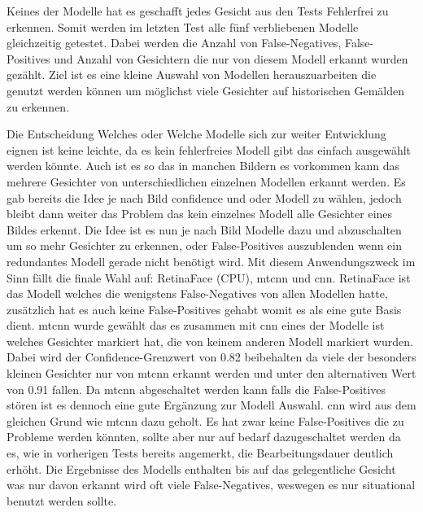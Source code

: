Keines der Modelle hat es geschafft jedes Gesicht aus den Tests Fehlerfrei zu erkennen. Somit werden im letzten Test alle fünf verbliebenen Modelle gleichzeitig getestet. Dabei werden die Anzahl von False-Negatives, False-Positives und Anzahl von Gesichtern die nur von diesem Modell erkannt wurden gezählt. Ziel ist es eine kleine Auswahl von Modellen herauszuarbeiten die genutzt werden können um möglichst viele Gesichter auf historischen Gemälden zu erkennen.

Die Entscheidung Welches oder Welche Modelle sich zur weiter Entwicklung eignen ist keine leichte, da es kein fehlerfreies Modell gibt das einfach ausgewählt werden könnte. Auch ist es so das in manchen Bildern es vorkommen kann das mehrere Gesichter von unterschiedlichen einzelnen Modellen erkannt werden. Es gab bereits die Idee je nach Bild confidence und oder Modell zu wählen, jedoch bleibt dann weiter das Problem das kein einzelnes Modell alle Gesichter eines Bildes erkennt. Die Idee ist es nun je nach Bild Modelle dazu und abzuschalten um so mehr Gesichter zu erkennen, oder False-Positives auszublenden wenn ein redundantes Modell gerade nicht benötigt wird. Mit diesem Anwendungszweck im Sinn fällt die finale Wahl auf: RetinaFace (CPU), \gls{mtcnn} und \gls{cnn}. RetinaFace ist das Modell welches die wenigstens False-Negatives von allen Modellen hatte, zusätzlich hat es auch keine False-Positives gehabt womit es als eine gute Basis dient. \gls{mtcnn} wurde gewählt das es zusammen mit \gls{cnn} eines der Modelle ist welches Gesichter markiert hat, die von keinem anderen Modell markiert wurden. Dabei wird der Confidence-Grenzwert von 0.82 beibehalten da viele der besonders kleinen Gesichter nur von \gls{mtcnn} erkannt werden und unter den alternativen Wert von 0.91 fallen. Da \gls{mtcnn} abgeschaltet werden kann falls die False-Positives stören ist es dennoch eine gute Ergänzung zur Modell Auswahl. \gls{cnn} wird aus dem gleichen Grund wie \gls{mtcnn} dazu geholt. Es hat zwar keine False-Positives die zu Probleme werden könnten, sollte aber nur auf bedarf dazugeschaltet werden da es, wie in vorherigen Tests bereits angemerkt, die Bearbeitungsdauer deutlich erhöht. Die Ergebnisse des Modells enthalten bis auf das gelegentliche Gesicht was nur davon erkannt wird oft viele False-Negatives, weswegen es nur situational benutzt werden sollte.